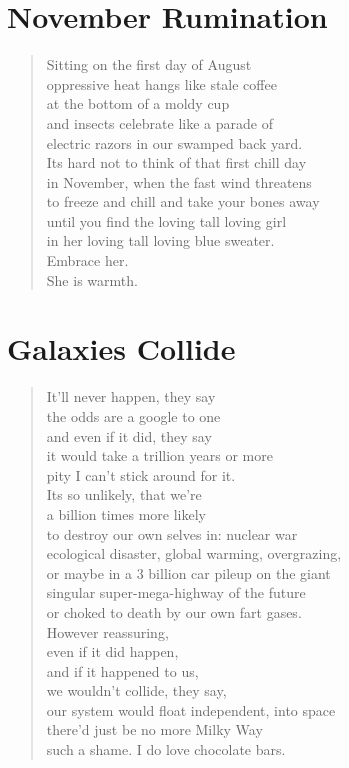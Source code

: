 \documentclass[times,12pt]{book}
\begin{document}
\section*{November Rumination}
\begin{verse}
Sitting on the first day of August\\
oppressive heat hangs like stale coffee\\
at the bottom of a moldy cup\\
and insects celebrate like a parade of\\
electric razors in our swamped back yard.\\[10pt]

Its hard not to think of that first chill day\\
in November, when the fast wind threatens\\
to freeze and chill and take your bones away\\
until you find the loving tall loving girl\\
in her loving tall loving blue sweater.\\[12pt]

Embrace her.\\
She is warmth.
\end{verse}
\newpage

\section*{Galaxies Collide}
\begin{verse}
It'll never happen, they say\\
the odds are a google to one\\
and even if it did, they say\\
it would take a trillion years or more\\[12pt]

pity I can't stick around for it.\\[12pt]

Its so unlikely, that we're\\
a billion times more likely\\
to destroy our own selves in: nuclear war\\
ecological disaster, global warming, overgrazing,\\
or maybe in a 3 billion car pileup on the giant\\
singular super-mega-highway of the future\\[12pt]

or choked to death by our own fart gases.\\[12pt]

However reassuring,\\
even if it did happen,\\
and if it happened to us,\\
we wouldn't collide, they say,\\
our system would float independent, into space\\
there'd just be no more Milky Way\\[12pt]

such a shame. I do love chocolate bars.
\end{verse}
\newpage
\end{document}
